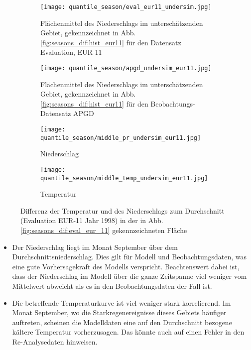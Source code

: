 \begin{figure}[h]
	\begin{subfigure}{0.49\textwidth}
		\texttt{[image: quantile\_season/eval\_eur11\_undersim.jpg]}
		\caption{Flächenmittel des Niederschlags im unterschätzenden Gebiet, gekennzeichnet in Abb.\ref{fig:seasons_dif:hist_eur11} für den Datensatz Evaluation, EUR-11}
		\label{fig:season:under_eval_eur11}
	\end{subfigure}
	\begin{subfigure}{0.49\textwidth}
		\texttt{[image: quantile\_season/apgd\_undersim\_eur11.jpg]}
		\caption{Flächenmittel des Niederschlags im unterschätzenden Gebiet, gekennzeichnet in Abb.\ref{fig:seasons_dif:hist_eur11} für den Beobachtungs-Datensatz APGD}
		\label{fig:season:under_apgd_eur11}
	\end{subfigure}
	\caption{}
\end{figure}

\begin{figure}[h]
	\begin{subfigure}{0.49\textwidth}
		\texttt{[image: quantile\_season/middle\_pr\_undersim\_eur11.jpg]}
		\caption{Niederschlag}
	\end{subfigure}
	\begin{subfigure}{0.49\textwidth}
		\texttt{[image: quantile\_season/middle\_temp\_undersim\_eur11.jpg]}
		\caption{Temperatur}
	\end{subfigure}
	\caption{Differenz der Temperatur und des Niederschlags zum Durchschnitt (Evaluation EUR-11 Jahr 1998) in der in Abb.\ref{fig:seasons_dif:eval_eur_11} gekennzeichneten Fläche}
	\label{fig:seasons:undersim_eval_eur11}
\end{figure}

\begin{itemize}
	\item Der Niederschlag liegt im Monat September über dem Durchschnittsniederschlag. Dies gilt für Modell und Beobachtungsdaten, was eine gute Vorhersagekraft des Modells verspricht. Beachtenswert dabei ist, dass der Niederschlag im Modell über die ganze Zeitspanne viel weniger vom Mittelwert abweicht als es in den Beobachtungsdaten der Fall ist.
	\item Die betreffende Temperaturkurve ist viel weniger stark korrelierend. Im Monat September, wo die Starkregenereignisse dieses Gebiets häufiger auftreten, scheinen die Modelldaten eine auf den Durchschnitt bezogene kältere Temperatur vorherzusagen. Das könnte auch auf einen Fehler in den Re-Analysedaten hinweisen.
\end{itemize}
\newpage

